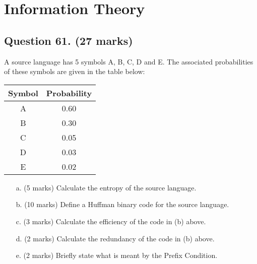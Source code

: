 


\section{Information Theory}

\subsection*{Question 61. (27 marks) }
A source language has 5 symbols A, B, C, D and E. The associated
probabilities of these symbols are given in the table below:
\begin{center}
	\begin{tabular}{|c|c|}
		\hline
		Symbol & Probability \\ \hline
		A & 0.60 \\
		B & 0.30 \\
		C & 0.05 \\
		D & 0.03 \\
		E & 0.02 \\
		\hline
	\end{tabular}
\end{center}

\begin{itemize}
	\item[a.](5 marks) Calculate the entropy of the source language.
	\item[b.](10 marks) Define a Huffman binary code for the source language.
	\item[c.](3 marks) Calculate the efficiency of the code in (b) above.
	\item[d.](2 marks) Calculate the redundancy of the code in (b) above.
	\item[e.](2 marks) Briefly state what is meant by the Prefix Condition.
\end{itemize}
